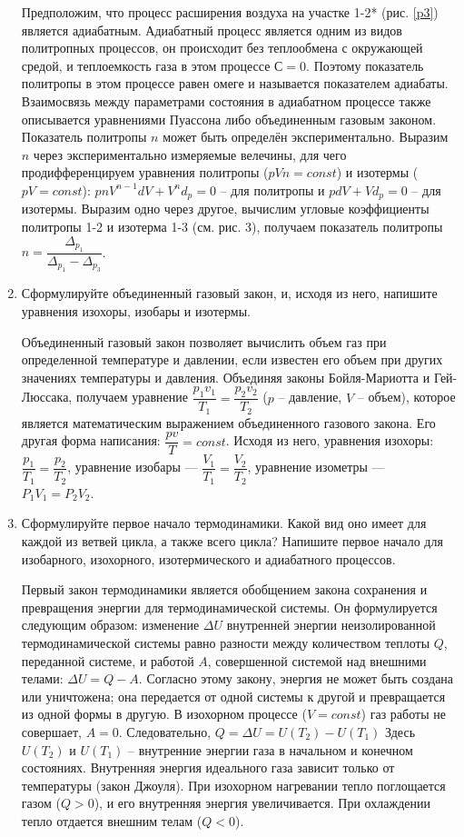 \documentclass[12pt,a4paper]{article}%
\begin{document}
\begin{enumerate}
	Предположим, что процесс расширения воздуха на участке 1-2* (рис. \ref{p3}) является адиабатным. Адиабатный процесс является одним из видов политропных процессов, он происходит без теплообмена с окружающей средой, и теплоемкость газа в этом процессе $С=0$. Поэтому показатель политропы в этом процессе равен омеге и называется показателем адиабаты. Взаимосвязь между параметрами состояния в адиабатном процессе также описывается уравнениями Пуассона либо объединенным газовым законом. Показатель политропы $n$ может быть определён экспериментально. Выразим $n$ через экспериментально измеряемые велечины, для чего продифференцируем уравнения политропы ($pVn = const$) и изотермы ($pV = const$): $pnV^{n-1}dV + V^nd_p = 0$ – для политропы и $pdV+Vd_p = 0$ – для изотермы. Выразим одно через другое, вычислим угловые коэффициенты политропы 1-2 и изотерма 1-3 (см. рис. 3), получаем показатель политропы $n = \dfrac{\Delta_{p_{1}}}{\Delta_{p_{1}}-\Delta_{p_{3}}}$.
	
	\item  Сформулируйте объединенный газовый закон, и, исходя из него, напишите уравнения изохоры, изобары и изотермы.
	
	Объединенный газовый закон позволяет вычислить объем газ при определенной температуре и давлении, если известен его объем при других значениях температуры и давления. Объединяя законы Бойля-Мариотта и Гей-Люссака, получаем уравнение $\dfrac{p_1v_1}{T_1} = \dfrac{p_2v_2}{T_2}$ ($p$ – давление, $V$ – объем), которое является математическим выражением объединенного газового закона. Его другая форма написания: $\dfrac{pv}{T} = const$. Исходя из него, уравнения изохоры: $\dfrac{p_1}{T_1} = \dfrac{p_2}{T_2}$, уравнение изобары --- $\dfrac{V_1}{T_1} = \dfrac{V_2}{T_2}$, уравнение изометры --- $P_1V_1 = P_2V_2$.
	
	\item Сформулируйте первое начало термодинамики. Какой вид оно имеет
	для каждой из ветвей цикла, а также всего цикла? Напишите первое начало для изобарного, изохорного, изотермического и адиабатного процессов.
	
	Первый закон термодинамики является обобщением закона сохранения и превращения энергии для термодинамической системы. Он формулируется следующим образом: изменение $\Delta U$ внутренней энергии неизолированной термодинамической системы равно разности между количеством теплоты $Q$, переданной системе, и работой $A$, совершенной системой над внешними телами: $\Delta U = Q - A$. Согласно этому закону, энергия не может быть создана или уничтожена; она передается от одной системы к другой и превращается из одной формы в другую.
	В изохорном процессе ($V=const$) газ работы не совершает, $A=0$. Следовательно, $Q = \Delta U = U(T_2) - U(T_1)$ Здесь $U(T_2)$ и $U(T_1)$ – внутренние энергии газа в начальном и конечном состояниях. Внутренняя энергия идеального газа зависит только от температуры (закон Джоуля). При изохорном нагревании тепло поглощается газом ($Q>0$), и его внутренняя энергия увеличивается. При охлаждении тепло отдается внешним телам ($Q<0$).
	

\end{enumerate}
\end{document}
